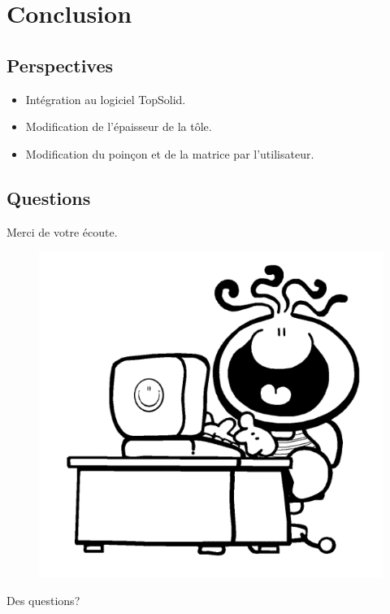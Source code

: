 \documentclass{beamer}
\begin{document}
\section{Conclusion}
\subsection{Perspectives}
\begin{frame}
    \begin{itemize}
        \item Intégration au logiciel TopSolid.
        \item Modification de l'épaisseur de la tôle.
        \item Modification du poinçon et de la matrice par l'utilisateur.
    \end{itemize}
\end{frame}
\subsection{Questions}
\begin{frame}
    Merci de votre écoute.
    \begin{figure}
        \includegraphics[width=.55\textwidth]{img/conclusion.png}
        \label{Conclusion}
    \end{figure}
    \hfill Des questions?
\end{frame}
\end{document}
